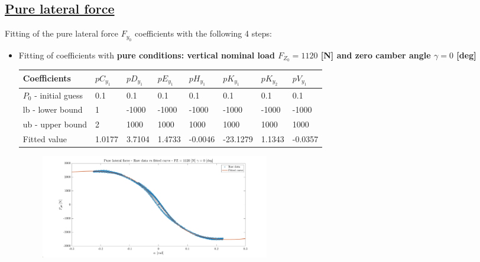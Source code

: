 \documentclass{IEEEtran}
\begin{document}
    \subsection{\textbf{\underline{Pure lateral force}}}
        Fitting of the pure lateral force $F_{y_0}$ coefficients with the following 4 steps:
        \begin{itemize}
            \item Fitting of coefficients with \textbf{pure conditions: vertical nominal load $F_{Z_0} = 1120$ [N] and zero camber angle $\gamma = 0$ [deg]} \\
        
                \begin{table}[htbp]
                \begin{adjustbox}{width=\columnwidth,center}
                    \begin{tabular}{|l|l|l|l|l|l|l|l|}
                    \hline
                    Coefficients       & $pC_{y_1}$   & $pD_{y_1}$   & $pE_{y_1}$   & $pH_{y_1}$    & $pK_{y_1}$     & $pK_{y_2}$   & $pV_{y_1}$    \\ \hline
                    $P_0$ - initial guess & 0.1    & 0.1    & 0.1    & 0.1     & 0.1      & 0.1    & 0.1     \\ \hline
                    lb - lower bound   & 1      & -1000  & -1000  & -1000   & -1000    & -1000  & -1000   \\ \hline
                    ub - upper bound   & 2      & 1000   & 1000   & 1000    & 1000     & 1000   & 1000    \\ \hline
                    Fitted value       & 1.0177 & 3.7104 & 1.4733 & -0.0046 & -23.1279 & 1.1343 & -0.0357 \\ \hline
                    \end{tabular}
                    \end{adjustbox}
                \end{table}
    
               
                \begin{figure}[htbp]
                    \centerline{\includegraphics[width = 3.95in]{pure_lateral_1.jpg}}
                   

\end{figure}
\end{itemize}
\end{document}
